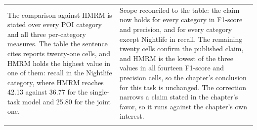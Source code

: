 {\begin{longtable}{@{}p{}p{}@{}}
The comparison against HMRM is stated over every POI category and all three per-category
measures. The table the sentence cites reports twenty-one cells, and HMRM holds the
highest value in one of them: recall in the Nightlife category, where HMRM reaches 42.13
against 36.77 for the single-task model and 25.80 for the joint one. &
Scope reconciled to the table: the claim now holds for every category in F1-score and
precision, and for every category except Nightlife in recall. The remaining twenty cells
confirm the published claim, and HMRM is the lowest of the three values in all fourteen
F1-score and precision cells, so the chapter's conclusion for this task is unchanged. The
correction narrows a claim stated in the chapter's favor, so it runs against the chapter's
own interest. \\
\addlinespace

\end{longtable}}
